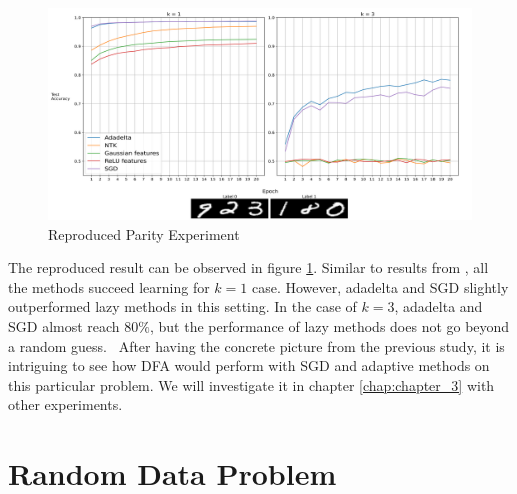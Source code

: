 \documentclass[a4paper, nobind]{templates/ociamthesis}
\begin{document}
\begin{figure}

{\centering \includegraphics[width=1\linewidth]{figures/2_k13_SGD_ada_BP_reproduced} 

}

\caption{Reproduced Parity Experiment \cite{DBLP:journals/corr/abs-2002-07400}}\label{fig:MNISTparity}
\end{figure}

\noindent The reproduced result can be observed in figure \ref{fig:MNISTparity}. Similar to results from \cite{DBLP:journals/corr/abs-2002-07400}, all the methods succeed learning for \(k=1\) case. However, adadelta and SGD slightly outperformed lazy methods in this setting. In the case of \(k=3\), adadelta and SGD almost reach \(80\%\), but the performance of lazy methods does not go beyond a random guess.~
After having the concrete picture from the previous study, it is intriguing to see how DFA would perform with SGD and adaptive methods on this particular problem. We will investigate it in chapter \ref{chap:chapter_3} with other experiments.

\hypertarget{random-data-problem}{%
\section{Random Data Problem}\label{random-data-problem}}
\end{document}
